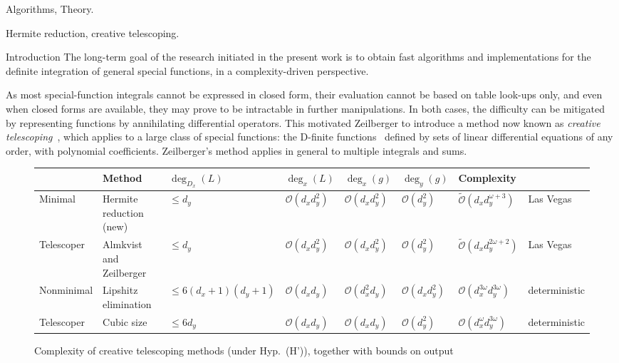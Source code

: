 \documentclass{sig-alt-full}
\newcommand{\bigO}{{\mathcal{O}}}
\newcommand{\bigOsoft}{\tilde{\mathcal{O}}}
\begin{document}
\vspace{1mm}
 Algorithms, Theory.

\vspace{1mm}
 Hermite reduction, creative telescoping.


\begin{section}{Introduction}
The long-term goal of the research initiated in the present work is to
obtain fast algorithms and implementations for the definite integration of
general special functions, in a complexity-driven perspective.

As most special-function integrals cannot be expressed in closed form,
their evaluation cannot be based on table look-ups only, and even when
closed forms are available, they may prove to be intractable in
further manipulations.  In both cases, the difficulty can be mitigated
by representing functions by annihilating differential operators.
This motivated Zeilberger to introduce a method now known as
\emph{creative telescoping\/}~\cite{Zeilberger1990}, which
applies to a large class of special functions:
the D-finite functions~\cite{Lipshitz1989} defined by
sets of linear differential equations of any order, with polynomial
coefficients.  Zeilberger's method applies in general to multiple
integrals and sums.

\begin{figure*} \begin{center} \renewcommand{\arraystretch}{1.2}
\begin{tabular}{l|l|ll|ll|ll}
  \hline
  & Method & $\deg_{D_x}(L)$ & $\deg_x(L)$ & $\deg_x(g)$ & $\deg_y(g)$ & Complexity & \\ \hline
  Minimal & Hermite reduction (new) & $\leq d_y$ & $\bigO(d_xd_y^2)$ & $\bigO(d_xd_y^2)$ &  $\bigO(d_y^2)$ & $\bigOsoft(d_xd_y^{\omega+3})$ & Las Vegas \\ \cline{2-8}
  Telescoper & Almkvist and Zeilberger & $\leq d_y$ & $\bigO(d_xd_y^2)$ & $\bigO(d_xd_y^2)$ & $\bigO(d_y^2)$ & $\bigOsoft(d_xd_y^{2\omega+2})$ & Las Vegas \\ \hline
  Nonminimal& Lipshitz elimination & $\leq6(d_x+1)(d_y+1)$ & $\bigO(d_x d_y)$ & $\bigO(d_x^2d_y)$ & $\bigO(d_xd_y^2)$ & $\bigO(d_x^{3\omega} d_y ^{3\omega})$ & deterministic \\\cline{2-8}
  Telescoper & Cubic size & $\leq6d_y$ & $\bigO(d_xd_y)$ & $\bigO(d_xd_y)$ & $\bigO(d_y^2)$ & $\bigO(d_x^{\omega}d_y^{3\omega})$ & deterministic \\\hline
\end{tabular}
\caption{Complexity of creative telescoping methods (under Hyp.~(H')), together with bounds on output}\label{fig:complexity}
\end{center}
\vskip-15pt
\end{figure*}





\end{section}
\end{document}
